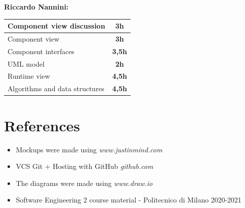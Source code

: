 \documentclass[]{article}
\begin{document}
		\medskip
		\textbf{\large Riccardo Nannini:} \\ \newline
		\begin{tabular}{|l|c|}
			\hline
			\begin{minipage}[t]{10cm}
				Component view discussion
			\end{minipage} 
			& \textbf{3h} \\ \hline
			\rowcolor[HTML]{DCDCDC} 
			Component view & \textbf{3h} \\ \hline
			Component interfaces & \textbf{3,5h} \\ \hline
			\rowcolor[HTML]{DCDCDC} 
			UML model & \textbf{2h} \\ \hline
			Runtime view & \textbf{4,5h} \\ \hline
			\rowcolor[HTML]{DCDCDC} 
			Algorithms and data structures & \textbf{4,5h} \\ \hline
		\end{tabular}
	
			
			\section{References}	
				\begin{itemize}
				\item Mockups were made using \textit{www.justinmind.com}
				\item VCS Git + Hosting with GitHub \textit{github.com}
				\item The diagrams were made using \textit{www.draw.io}
				\item Software Engineering 2 course material - Politecnico di Milano 2020-2021
			\end{itemize}
			
	

				
\end{document}
